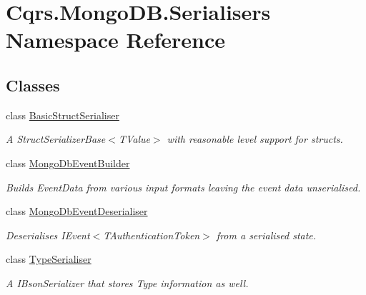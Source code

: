 \hypertarget{namespaceCqrs_1_1MongoDB_1_1Serialisers}{}\section{Cqrs.\+Mongo\+D\+B.\+Serialisers Namespace Reference}
\label{namespaceCqrs_1_1MongoDB_1_1Serialisers}
\subsection*{Classes}
\begin{DoxyCompactItemize}
\item 
class \hyperlink{classCqrs_1_1MongoDB_1_1Serialisers_1_1BasicStructSerialiser}{Basic\+Struct\+Serialiser}
\begin{DoxyCompactList}\small\item\em A Struct\+Serializer\+Base$<$\+T\+Value$>$ with reasonable level support for structs. \end{DoxyCompactList}\item 
class \hyperlink{classCqrs_1_1MongoDB_1_1Serialisers_1_1MongoDbEventBuilder}{Mongo\+Db\+Event\+Builder}
\begin{DoxyCompactList}\small\item\em Builds Event\+Data from various input formats leaving the event data unserialised. \end{DoxyCompactList}\item 
class \hyperlink{classCqrs_1_1MongoDB_1_1Serialisers_1_1MongoDbEventDeserialiser}{Mongo\+Db\+Event\+Deserialiser}
\begin{DoxyCompactList}\small\item\em Deserialises I\+Event$<$\+T\+Authentication\+Token$>$ from a serialised state. \end{DoxyCompactList}\item 
class \hyperlink{classCqrs_1_1MongoDB_1_1Serialisers_1_1TypeSerialiser}{Type\+Serialiser}
\begin{DoxyCompactList}\small\item\em A I\+Bson\+Serializer that stores Type information as well. \end{DoxyCompactList}\end{DoxyCompactItemize}
